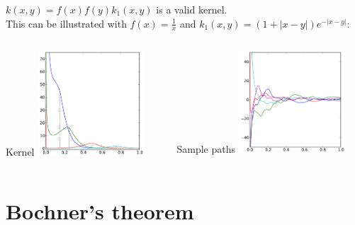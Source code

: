 \documentclass{beamer}
\begin{document}
\begin{frame}{}
\begin{example}
$k(x,y) = f(x)f(y)k_1(x,y)$ is a valid kernel.\\
\vspace{0.5cm}
This can be illustrated with $f(x) = \frac1x$ and $k_1(x,y) = (1 + |x-y|) e^{-|x-y|}$:\\ 
\begin{columns}[c]
\begin{column}{5cm}
\begin{center}
Kernel
\includegraphics[width=4cm]{figures/python/newfromold-prodfunc-k}
\end{center}
\end{column}
\begin{column}{5cm}
\begin{center}
Sample paths
\includegraphics[width=4cm]{figures/python/newfromold-prodfunc-traj}
\end{center}
\end{column}
\end{columns}
\end{example}
\end{frame}


\section[Bochner]{Bochner's theorem}
\subsection{}
\end{document}
